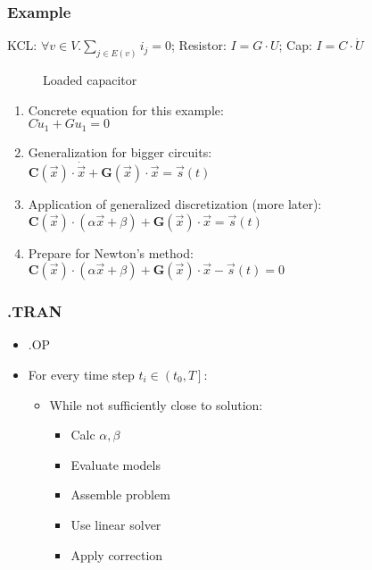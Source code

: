 \begin{frame}
\frametitle{Example}
KCL: \(\forall v \in V. \sum_{j \in E(v)} i_{j} = 0\); Resistor: \(I = G \cdot U\); Cap: \(I = C \cdot \dot{U}\)
\begin{figure}[ht]
    \centering
        \begin{circuitikz}
            
        \end{circuitikz}
    \caption{Loaded capacitor}
\label{fig:cap}
\end{figure}
\pause
\begin{enumerate}[<+->]
    \item Concrete equation for this example:\\
        \(C\dot{u}_1 + Gu_1 = 0\)
    \item Generalization for bigger circuits:\\
        \(\mathbf{C}(\vec{x}) \cdot \dot{\vec{x}} + \mathbf{G}(\vec{x}) \cdot  \vec{x} = \vec{s}(t)\)
    \item Application of generalized discretization (more later):\\
        \(\mathbf{C}(\vec{x}) \cdot (\alpha \vec{x} + \beta) + \mathbf{G}(\vec{x}) \cdot  \vec{x} = \vec{s}(t)\)
    \item Prepare for Newton's method:\\
        \(\mathbf{C}(\vec{x}) \cdot (\alpha \vec{x} + \beta) + \mathbf{G}(\vec{x}) \cdot  \vec{x} - \vec{s}(t)= 0\)
\end{enumerate}
\end{frame}

\begin{frame}
\frametitle{.TRAN}
\begin{itemize}
    \item .OP
    \item For every time step \(t_i \in \left(t_0, T\right]\):
    \begin{itemize}
        \item While not sufficiently close to solution:
        \begin{itemize}
            \item Calc \(\alpha, \beta\)
            \item Evaluate models
            \item Assemble problem
            \item Use linear solver
            \item Apply correction
        \end{itemize}
    \end{itemize}
\end{itemize}
\end{frame}


